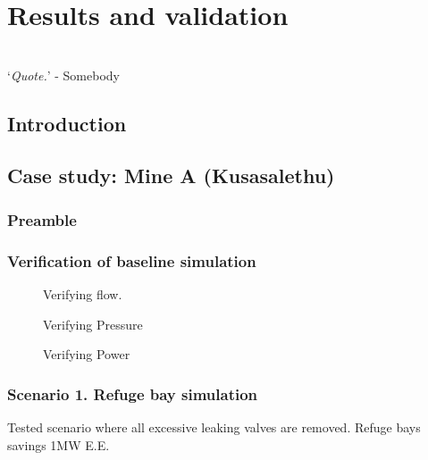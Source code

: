 \chapter{Results and validation}
\thispagestyle{empty}
\vspace{38em}
\hrulefill
\\
\enquote*{\textit{Quote.}} - Somebody\\
\newpage
\section{Introduction}
\section{Case study: Mine A \color{blue}(Kusasalethu)}
	\subsection{Preamble}
	
	\subsection{Verification of baseline simulation}
	\begin{figure}[h]
		\centering
		\fbox{}
		\caption{Verifying flow.}
		\label{fig: Verification flow kusasalethu}
	\end{figure}

	\begin{figure}[h]
		\centering
		\fbox{}
		\caption{Verifying Pressure}
		\label{fig: Verification Pressure kusasalethu}
	\end{figure}

	\begin{figure}[h]
		\centering
		\fbox{}
		\caption{Verifying Power}
		\label{fig: Verification Power kusasalethu}
	\end{figure}

	\subsection{Scenario 1. Refuge bay simulation}
	Tested scenario where all excessive leaking valves are removed.
	Refuge bays savings 1MW E.E.
	
